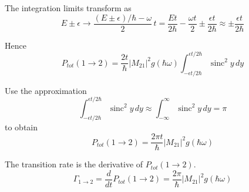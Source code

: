 The integration limits transform as
\begin{equation*}
E\pm\epsilon
\rightarrow
\frac{(E\pm\epsilon)/\hbar-\omega}{2}\,t
=\frac{Et}{2\hbar}-\frac{\omega t}{2}
\pm\frac{\epsilon t}{2\hbar}
\approx
\pm\frac{\epsilon t}{2\hbar}
\end{equation*}

Hence
\begin{equation*}
P_{tot}(1\rightarrow2)=\frac{2t}{\hbar}|M_{21}|^2g(\hbar\omega)
\int_{-\epsilon t/2\hbar}^{\epsilon t/2\hbar}
\operatorname{sinc}^2y\,dy
\end{equation*}

Use the approximation
\begin{equation*}
\int_{-\epsilon t/2\hbar}^{\epsilon t/2\hbar}\operatorname{sinc}^2 y\,dy
\approx
\int_{-\infty}^\infty\operatorname{sinc}^2 y\,dy=\pi
\end{equation*}
%
to obtain
\begin{equation*}
P_{tot}(1\rightarrow2)=\frac{2\pi t}{\hbar}|M_{21}|^2g(\hbar\omega)
\end{equation*}

The transition rate is the derivative of $P_{tot}(1\rightarrow2)$.
\begin{equation*}
\Gamma_{1\rightarrow2}
=\frac{d}{dt}P_{tot}(1\rightarrow2)=\frac{2\pi}{\hbar}|M_{21}|^2g(\hbar\omega)
\end{equation*}


